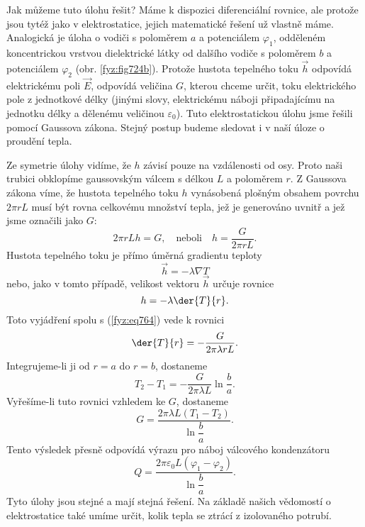     Jak můžeme tuto úlohu řešit? Máme k dispozici diferenciální rovnice, ale protože jsou tytéž jako
    v elektrostatice, jejich matematické řešení už vlastně máme. Analogická je úloha o vodiči s
    poloměrem \(a\) a potenciálem \(\varphi_1\), odděleném koncentrickou vrstvou dielektrické látky
    od dalšího vodiče s poloměrem \(b\) a potenciálem \(\varphi_2\) (obr. \ref{fyz:fig724b}).
    Protože hustota tepelného toku \(\vec{h}\) odpovídá elektrickému poli \(\vec{E}\), odpovídá
    veličina \(G\), kterou chceme určit, toku elektrického pole z jednotkové délky (jinými slovy,
    elektrickému náboji připadajícímu na jednotku délky a dělenému veličinou \(\varepsilon_0\)).
    Tuto elektrostatickou úlohu jsme řešili pomocí Gaussova zákona. Stejný postup budeme sledovat i
    v naší úloze o proudění tepla.

    Ze symetrie úlohy vidíme, že \(h\) závisí pouze na vzdálenosti od osy. Proto naši trubici
    obklopíme gaussovským válcem s délkou \(L\) a poloměrem \(r\). Z Gaussova zákona víme, že
    hustota tepelného toku \(h\) vynásobená plošným obsahem povrchu \(2\pi rL\) musí být rovna
    celkovému množství tepla, jež je generováno uvnitř a jež jsme označili jako \(G\):
    \begin{equation}\label{fyz:eq764}
      2\pi rLh= G, \quad \text{neboli}\quad h = \dfrac{G}{ 2\pi rL}.
    \end{equation}
    Hustota tepelného toku je přímo úměrná gradientu teploty
    \begin{equation*}
      \vec{h} = -\lambda\nabla T
    \end{equation*}
    nebo, jako v tomto případě, velikost vektoru \(\vec{h}\) určuje rovnice
    \begin{equation*}
      h = -\lambda\der{T}{r}.
    \end{equation*}
    Toto vyjádření spolu s (\ref{fyz:eq764}) vede k rovnici
    \begin{equation}\label{fyz:eq765}
       \der{T}{r} = -\dfrac{G}{2\pi\lambda rL}.
    \end{equation}
    Integrujeme-li ji od \(r=a\) do \(r=b\), dostaneme
    \begin{equation}\label{fyz:eq766}
      T_2 - T_1 = -\dfrac{G}{2\pi\lambda L}\ln\dfrac{b}{a}.
    \end{equation}
    Vyřešíme-li tuto rovnici vzhledem ke \(G\), dostaneme
    \begin{equation}\label{fyz:eq767}
      G = \dfrac{2\pi\lambda L(T_1 - T_2)}{\ln\dfrac{b}{a}}.
    \end{equation}
    Tento výsledek přesně odpovídá výrazu pro náboj válcového kondenzátoru
    \begin{equation}\label{fyz:eq768}
      Q = \dfrac{2\pi\varepsilon_0 L(\varphi_1 - \varphi_2)}{\ln\dfrac{b}{a}}.
    \end{equation}
    Tyto úlohy jsou stejné a mají stejná řešení. Na základě našich vědomostí o elektrostatice také 
    umíme určit, kolik tepla se ztrácí z izolovaného potrubí.

